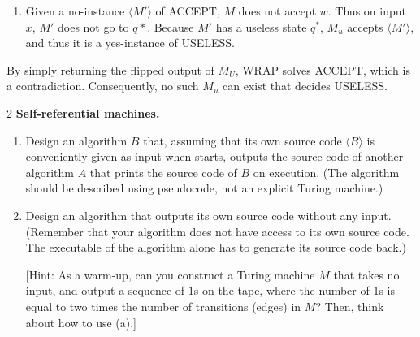 \documentclass[12pt]{article}
\begin{document}
\begin{solution}
\begin{enumerate}
        \item Given a no-instance $\langle M' \rangle$ of ACCEPT, $M$ does not accept $w$. Thus on input $x$, $M'$ does not go to $q*$. Because $M'$ has a useless state $q^*$, $M_u$ accepts $\langle M' \rangle$, and thus it is a yes-instance of USELESS.
    \end{enumerate}
    
    By simply returning the flipped output of $M_U$, WRAP solves ACCEPT, which is a contradiction. Consequently, no such $M_u$ can exist that decides USELESS. 
    
\end{solution}

\newpage 

 \begin{problem}{2}
    \textbf{Self-referential machines. }
    \begin{enumerate}
        \item [(a)] Design an algorithm $B$ that, assuming that its own source code $\langle B \rangle$ is conveniently given as input when starts, outputs the source code of another algorithm $A$ that prints the source code of $B$ on execution. (The algorithm should be described using pseudocode, not an explicit Turing machine.)
        \item [(b)] Design an algorithm that outputs its own source code without any input. (Remember that your algorithm does not have access to its own source code. The executable of the algorithm alone has to generate its source code back.)
        
        [Hint: As a warm-up, can you construct a Turing machine $M$ that takes no input, and output a sequence of $1$s on the tape, where the number of $1$s is equal to two times the number of transitions (edges) in $M$? Then, think about how to use (a).]
    \end{enumerate}
\end{problem}\
\end{document}
